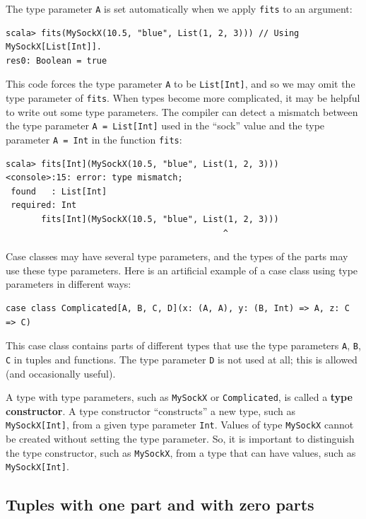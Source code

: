 The type parameter \lstinline!A! is set automatically when we apply
\lstinline!fits! to an argument:
\begin{lstlisting}
scala> fits(MySockX(10.5, "blue", List(1, 2, 3))) // Using MySockX[List[Int]].
res0: Boolean = true
\end{lstlisting}
This code forces the type parameter \lstinline!A! to be \lstinline!List[Int]!,
and so we may omit the type parameter of \lstinline!fits!. When types
become more complicated, it may be helpful to write out some type
parameters. The compiler can detect a mismatch between the type parameter
\lstinline!A = List[Int]! used in the \textsf{``}sock\textsf{''} value and the type
parameter \lstinline!A = Int! in the function \lstinline!fits!:
\begin{lstlisting}
scala> fits[Int](MySockX(10.5, "blue", List(1, 2, 3)))
<console>:15: error: type mismatch;
 found   : List[Int]
 required: Int
       fits[Int](MySockX(10.5, "blue", List(1, 2, 3)))
                                           ^ 
\end{lstlisting}

Case classes may have several type parameters, and the types of the
parts may use these type parameters. Here is an artificial example
of a case class using type parameters in different ways:
\begin{lstlisting}
case class Complicated[A, B, C, D](x: (A, A), y: (B, Int) => A, z: C => C)
\end{lstlisting}
This case class contains parts of different types that use the type
parameters \lstinline!A!, \lstinline!B!, \lstinline!C! in tuples
and functions. The type parameter \lstinline!D! is not used at all;
this is allowed (and occasionally useful).

A type with type parameters, such as \lstinline!MySockX! or \lstinline!Complicated!,
is called a \textbf{type constructor}. A
type constructor \textsf{``}constructs\textsf{''} a new type, such as \lstinline!MySockX[Int]!,
from a given type parameter \lstinline!Int!. Values of type \lstinline!MySockX!
cannot be created without setting the type parameter. So, it is important
to distinguish the type constructor, such as \lstinline!MySockX!,
from a type that can have values, such as \lstinline!MySockX[Int]!.

\subsection{Tuples with one part and with zero parts}

